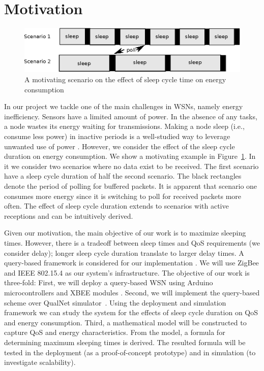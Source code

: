 \section{Motivation} \label{sec:motivation}


\begin{figure}[t]
\centering
\includegraphics[scale=0.65]{figures/drawing.eps}
\caption{A motivating scenario on the effect of sleep cycle time on energy consumption}
\label{fig:motivating}
\end{figure}

In our project we tackle one of the main challenges in WSNs, namely energy inefficiency. Sensors have a limited amount of power. In the absence of any tasks, a node wastes its energy waiting for transmissions. Making a node sleep (i.e., consume less power) in inactive periods is a well-studied way to leverage unwanted use of power \cite{1}. However, we consider the effect of the sleep cycle duration on energy consumption. We show a motivating example in Figure~\ref{fig:motivating}. In it we consider two scenarios where no data exist to be received. The first scenario have a sleep cycle duration of half the second scenario. The black rectangles denote the period of polling for buffered packets. It is apparent that scenario one consumes more energy since it is switching to poll for received packets more often. The effect of sleep cycle duration extends to scenarios with active receptions and can be intuitively derived.  

Given our motivation, the main objective of our work is to maximize sleeping times. However, there is a tradeoff between sleep times and QoS requirements (we consider delay); longer sleep cycle duration translate to larger delay times. A query-based framework is considered for our implementation \cite{2}. We will use ZigBee and IEEE 802.15.4 \cite{3} as our system's infrastructure. The objective of our work is three-fold: First, we will deploy a query-based WSN using Arduino microcontrollers \cite{17} and XBEE modules \cite{18}. Second, we will implement the query-based scheme over QualNet simulator~\cite{16}. Using the deployment and simulation framework we can study the system for the effects of sleep cycle duration on QoS and energy consumption. Third, a mathematical model will be constructed to capture QoS and energy characteristics. From the model, a formula for determining maximum sleeping times is derived. The resulted formula will be tested in the deployment (as a proof-of-concept prototype) and in simulation (to investigate scalability).

